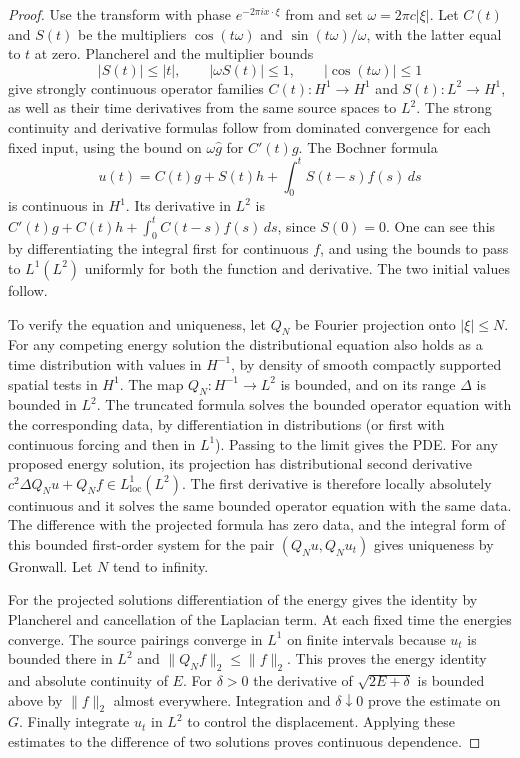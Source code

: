 \documentclass[11pt,oneside,openany]{book}
\theoremstyle{plain}
\theoremstyle{definition}
\theoremstyle{remark}
\begin{document}
\begin{proof}
Use the transform with phase \(e^{-2\pi i x\cdot\xi}\) from
\cite[Unit U3]{P102} and set \(\omega=2\pi c|\xi|\).
Let \(C(t)\) and \(S(t)\) be the multipliers
\(\cos(t\omega)\) and \(\sin(t\omega)/\omega\), with the latter
equal to \(t\) at zero. Plancherel and the multiplier bounds
\[
 |S(t)|\leq |t|,\qquad |\omega S(t)|\leq 1,\qquad
 |\cos(t\omega)|\leq 1
\]
give strongly continuous operator families \(C(t):H^1\to H^1\)
and \(S(t):L^2\to H^1\), as well as their time derivatives from
the same source spaces to \(L^2\).
The strong continuity and derivative formulas follow from
dominated convergence for each fixed input, using the bound on
\(\omega\widehat g\) for \(C'(t)g\). The Bochner formula
\[
 u(t)=C(t)g+S(t)h+\int_0^t S(t-s)f(s)\,ds
\]
is continuous in \(H^1\). Its derivative in \(L^2\) is
\(C'(t)g+C(t)h+\int_0^t C(t-s)f(s)\,ds\), since \(S(0)=0\).
One can see this by differentiating the integral first for continuous
\(f\), and using the bounds to pass to \(L^1(L^2)\) uniformly
for both the function and derivative. The two initial values follow.

To verify the equation and uniqueness, let \(Q_N\) be Fourier
projection onto \(|\xi|\leq N\). For any competing energy
solution the distributional equation also holds as a time
distribution with values in \(H^{-1}\), by density of smooth
compactly supported spatial tests in \(H^1\). The map
\(Q_N:H^{-1}\to L^2\) is bounded, and on its range \(\Delta\)
is bounded in \(L^2\). The truncated formula solves the bounded
operator equation with the corresponding data, by differentiation
in distributions (or first with continuous forcing and then in
\(L^1\)). Passing to the limit gives the PDE. For any proposed
energy solution, its projection has distributional second derivative
\(c^2\Delta Q_Nu+Q_N f\in L^1_{\mathrm{loc}}(L^2)\). The first
derivative is therefore locally absolutely continuous and it
solves the same bounded operator equation with the same data.
The difference with the projected formula has zero data, and
the integral form of this bounded first-order system for the pair
\((Q_Nu,Q_Nu_t)\) gives uniqueness by Gronwall. Let \(N\) tend to
infinity.

For the projected solutions differentiation of the energy gives
the identity by Plancherel and cancellation of the Laplacian term.
At each fixed time the energies converge. The source pairings
converge in \(L^1\) on finite intervals because \(u_t\) is bounded
there in \(L^2\) and \(\|Q_Nf\|_2\leq\|f\|_2\).
This proves the energy identity and absolute continuity of \(E\).
For \(\delta>0\) the derivative of \(\sqrt{2E+\delta}\) is
bounded above by \(\|f\|_2\) almost everywhere. Integration and
\(\delta\downarrow0\) prove the estimate on \(G\).
Finally integrate \(u_t\) in \(L^2\) to control the displacement.
Applying these estimates to the difference of two solutions
proves continuous dependence.
\end{proof}
\end{document}
